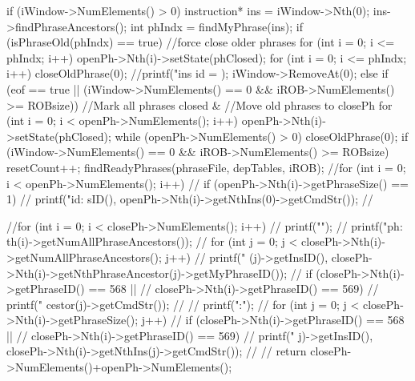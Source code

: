 \begin{DoxyCode}
                                                                                 
                                                                           {
        if (iWindow->NumElements() > 0) {
                instruction* ins = iWindow->Nth(0);
                ins->findPhraseAncestors();
                int phIndx = findMyPhrase(ins);
                if (isPhraseOld(phIndx) == true) {
                        //force close older phrases
                        for (int i = 0; i <= phIndx; i++) {
                                openPh->Nth(i)->setState(phClosed);
                        }
                        for (int i = 0; i <= phIndx; i++) {
                                closeOldPhrase(0);
                        }
                }
                //printf("ins id = %
      );
                iWindow->RemoveAt(0);
        } else if (eof == true || 
                   (iWindow->NumElements() == 0 &&
                   iROB->NumElements() >= ROBsize)) {
                //Mark all phrases closed &
                //Move old phrases to closePh
                for (int i = 0; i < openPh->NumElements(); i++) {
                        openPh->Nth(i)->setState(phClosed);
                }
                while (openPh->NumElements() > 0) {
                        closeOldPhrase(0);
                }
                if (iWindow->NumElements() == 0 &&
                    iROB->NumElements() >= ROBsize) {
                        resetCount++;
                }
        }
        findReadyPhrases(phraseFile, depTables, iROB);
        //for (int i = 0; i < openPh->NumElements(); i++) {
        //      if (openPh->Nth(i)->getPhraseSize() == 1) 
        //              printf("id: %
      sID(), openPh->Nth(i)->getNthIns(0)->getCmdStr());
        //}

        //for (int i = 0; i < closePh->NumElements(); i++) {
        //      printf("\n");
        //      printf("ph: %
      th(i)->getNumAllPhraseAncestors());
        //      for (int j = 0; j < closePh->Nth(i)->getNumAllPhraseAncestors(); 
      j++) {
        //              printf("%
      (j)->getInsID(), closePh->Nth(i)->getNthPhraseAncestor(j)->getMyPhraseID());
        //              if (closePh->Nth(i)->getPhraseID() == 568 ||
        //                  closePh->Nth(i)->getPhraseID() == 569)
        //                      printf("%
      cestor(j)->getCmdStr());
        //      }
        //      printf("\nmembers:\n");
        //      for (int j = 0; j < closePh->Nth(i)->getPhraseSize(); j++) {
        //              if (closePh->Nth(i)->getPhraseID() == 568 ||
        //                  closePh->Nth(i)->getPhraseID() == 569)
        //                      printf("%
      j)->getInsID(), closePh->Nth(i)->getNthIns(j)->getCmdStr());
        //      }
        //}
        return closePh->NumElements()+openPh->NumElements();
}
\end{DoxyCode}


